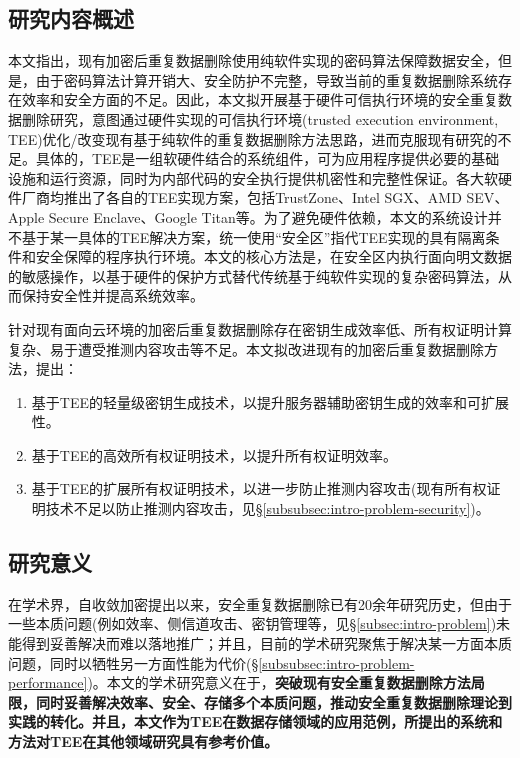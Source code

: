 \subsection{研究内容概述}
\label{subsec:intro-content}

本文指出，现有加密后重复数据删除使用纯软件实现的密码算法保障数据安全，但是，由于密码算法计算开销大、安全防护不完整，导致当前的重复数据删除系统存在效率和安全方面的不足。因此，本文拟开展基于硬件可信执行环境的安全重复数据删除研究，意图通过硬件实现的可信执行环境(trusted execution environment, TEE)优化/改变现有基于纯软件的重复数据删除方法思路，进而克服现有研究的不足。具体的，TEE是一组软硬件结合的系统组件，可为应用程序提供必要的基础设施和运行资源，同时为内部代码的安全执行提供机密性和完整性保证\cite{OMTP}。各大软硬件厂商均推出了各自的TEE实现方案，包括TrustZone\cite{trustzone}、Intel SGX\cite{sgx,sgx2}、AMD SEV\cite{AMDSEV}、Apple Secure Enclave\cite{AppleSecureEnclave}、Google Titan\cite{GoogleTitan}等。为了避免硬件依赖，本文的系统设计并不基于某一具体的TEE解决方案，统一使用“安全区”指代TEE实现的具有隔离条件和安全保障的程序执行环境。本文的核心方法是，在安全区内执行面向明文数据的敏感操作，以基于硬件的保护方式替代传统基于纯软件实现的复杂密码算法，从而保持安全性并提高系统效率。

针对现有面向云环境的加密后重复数据删除存在密钥生成效率低、所有权证明计算复杂、易于遭受推测内容攻击等不足。本文拟改进现有的加密后重复数据删除方法，提出：

\begin{enumerate}[leftmargin=*]
    \item 基于TEE的轻量级密钥生成技术，以提升服务器辅助密钥生成的效率和可扩展性。
    \item 基于TEE的高效所有权证明技术，以提升所有权证明效率。
    \item 基于TEE的扩展所有权证明技术，以进一步防止推测内容攻击(现有所有权证明技术不足以防止推测内容攻击，见\S\ref{subsubsec:intro-problem-security})。
\end{enumerate}

\subsection{研究意义}
\label{subsec:intro-meaning}

在学术界，自收敛加密\cite{douceur2002reclaiming}提出以来，安全重复数据删除已有20余年研究历史，但由于一些本质问题(例如效率、侧信道攻击、密钥管理等，见\S\ref{subsec:intro-problem})未能得到妥善解决而难以落地推广；并且，目前的学术研究聚焦于解决某一方面本质问题，同时以牺牲另一方面性能为代价(\S\ref{subsubsec:intro-problem-performance})。本文的学术研究意义在于，\textbf{突破现有安全重复数据删除方法局限，同时妥善解决效率、安全、存储多个本质问题，推动安全重复数据删除理论到实践的转化。并且，本文作为TEE在数据存储领域的应用范例，所提出的系统和方法对TEE在其他领域研究具有参考价值。}

